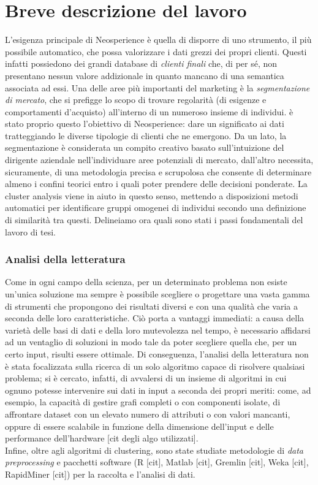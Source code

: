 \section{Breve descrizione del lavoro}
L'esigenza principale di Neosperience \`e quella di disporre di uno strumento, il pi\`u possibile automatico, che possa valorizzare i dati grezzi dei propri clienti. Questi infatti possiedono dei grandi database di \textit{clienti finali} che, di per s\'e, non presentano nessun valore addizionale in quanto mancano di una semantica associata ad essi. Una delle aree pi\`u importanti del marketing \`e la \textit{segmentazione di mercato}, che si prefigge lo scopo di trovare regolarit\`a (di esigenze e comportamenti d'acquisto) all'interno di un numeroso insieme di individui. \`e stato proprio questo l'obiettivo di Neosperience: dare un significato ai dati tratteggiando le diverse tipologie di clienti che ne emergono. Da un lato, la segmentazione \`e considerata un compito creativo basato sull'intuizione del dirigente aziendale nell'individuare aree potenziali di mercato, dall'altro necessita, sicuramente, di una metodologia precisa e scrupolosa che consente di determinare almeno i confini teorici entro i quali poter prendere delle decisioni ponderate. La cluster analysis viene in aiuto in questo senso, mettendo a disposizioni metodi automatici per identificare gruppi omogenei di individui secondo una definizione di similarit\`a tra questi. 
Delineiamo ora quali sono stati i passi fondamentali del lavoro di tesi.

\subsubsection{Analisi della letteratura}
Come in ogni campo della scienza, per un determinato problema non esiste un'unica soluzione ma sempre \`e possibile scegliere o progettare una vasta gamma di strumenti che propongono dei risultati diversi e con una qualit\`a che varia a seconda delle loro caratteristiche. Ci\`o porta a vantaggi immediati: a causa della variet\`a delle basi di dati e della loro mutevolezza nel tempo, \`e necessario affidarsi ad un ventaglio di soluzioni in modo tale da poter scegliere quella che, per un certo input, risulti essere ottimale. Di conseguenza, l'analisi della letteratura non \`e stata focalizzata sulla ricerca di un solo algoritmo capace di risolvere qualsiasi problema; si \`e cercato, infatti, di avvalersi di un insieme di algoritmi in cui ognuno potesse intervenire sui dati in input a seconda dei propri meriti: come, ad esempio, la capacit\`a di gestire grafi completi o con componenti isolate, di affrontare dataset con un elevato numero di attributi o con valori mancanti, oppure di essere scalabile in funzione della dimensione dell'input e delle performance dell'hardware [cit degli algo utilizzati].\\
Infine, oltre agli algoritmi di clustering, sono state studiate metodologie di \textit{data preprocessing} e pacchetti software (R [cit], Matlab [cit], Gremlin [cit], Weka [cit], RapidMiner [cit]) per la raccolta e l'analisi di dati.

